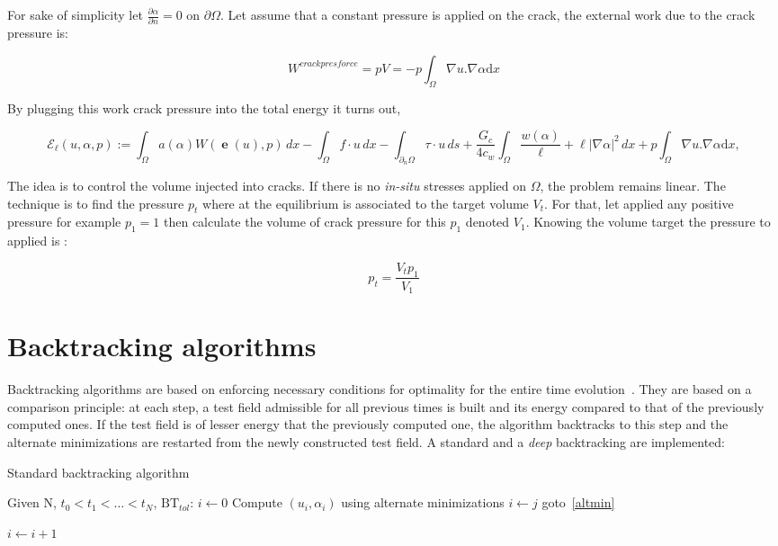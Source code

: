 \documentclass[10pt,oneside]{memoir}
\DeclareMathOperator{\e}{{\mathbf e}}
\begin{document}
For sake of simplicity let $\frac{\partial \alpha}{\partial n} = 0 $ on $\partial \Omega$. Let assume that a constant pressure is applied on the crack, the external work due to the crack pressure is:

$$ W^{crack pres force} =  pV = - p \int_{\Omega} \nabla u . \nabla \alpha \mathrm{d}x$$ 

By plugging this work crack pressure into the total energy it turns out,

\begin{equation}
	\label{eq:defEll}
	\mathcal{E}_\ell(u,\alpha,p) := \int_\Omega a(\alpha) W(\e(u),p)\, dx - \int_\Omega f\cdot u \, dx - \int_{\partial_n \Omega} \tau \cdot u \, ds + \frac{G_c}{4c_w} \int_\Omega \frac{w(\alpha)}{\ell} + \ell|\nabla \alpha|^2\, dx + p \int_{\Omega} \nabla u . \nabla \alpha \mathrm{d}x,
\end{equation}

The idea is to control the volume injected into cracks. If there is no \textit{in-situ} stresses applied on $\Omega$, the problem remains linear. The technique is to find the pressure $p_t$ where at the equilibrium is associated to the target volume $V_t$. For that, let applied any positive pressure for example $p_1=1$ then calculate the volume of crack pressure for this $p_1$ denoted $V_1$. Knowing the volume target the pressure to applied is :

$$ p_t=\frac{V_t p_1}{V_1}$$



\section{Backtracking algorithms}
\label{sec:BT}
Backtracking algorithms are based on enforcing necessary conditions for optimality for the entire time evolution~\cite{Bourdin-2007a}. They are based on a comparison principle: at each step, a test field admissible for all previous times is built and its energy compared to that of the previously computed ones. If the test field is of lesser energy that the previously computed one, the algorithm backtracks to this step and the alternate minimizations are restarted from the newly constructed test field. A standard and a \emph{deep} backtracking are implemented:

\begin{algorithm}
	\caption{Standard backtracking algorithm}
	\label{algo:StdBT}
		\begin{algorithmic}[1]
			\State Given N, $t_0 < t_1 < \dots < t_N$, $\mathrm{BT}_{tol}$:
			\State $i \leftarrow 0$
			\Repeat
				\State Compute $(u_i,\alpha_i)$ using alternate minimizations\label{altmin}
						\State $i \leftarrow j$
						\State goto~\ref{altmin}
					\EndIf	
				\EndFor
				
			\State $i \leftarrow i+1$
		\end{algorithmic}
\end{algorithm}
\end{document}
